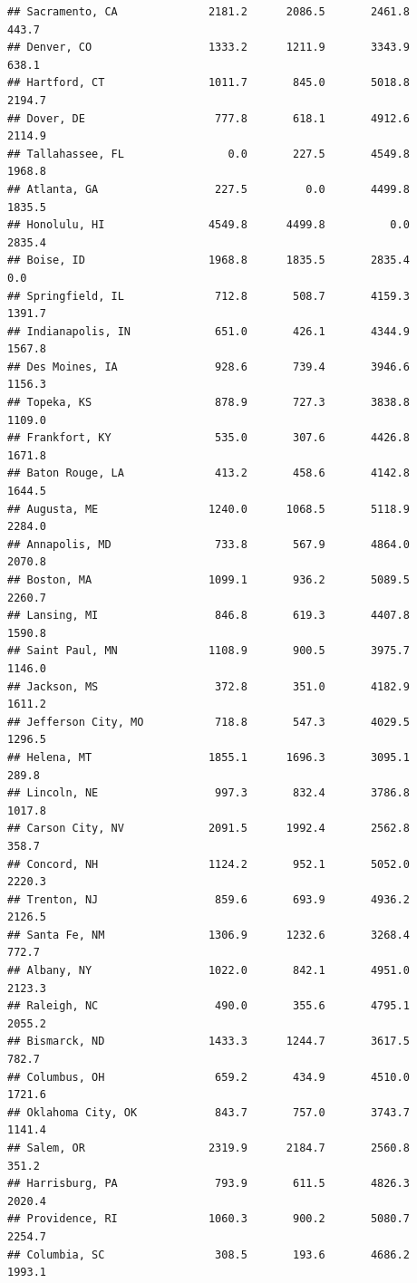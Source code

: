 \documentclass[
]{article}
\begin{document}
\begin{verbatim}
## Sacramento, CA              2181.2      2086.5       2461.8     443.7
## Denver, CO                  1333.2      1211.9       3343.9     638.1
## Hartford, CT                1011.7       845.0       5018.8    2194.7
## Dover, DE                    777.8       618.1       4912.6    2114.9
## Tallahassee, FL                0.0       227.5       4549.8    1968.8
## Atlanta, GA                  227.5         0.0       4499.8    1835.5
## Honolulu, HI                4549.8      4499.8          0.0    2835.4
## Boise, ID                   1968.8      1835.5       2835.4       0.0
## Springfield, IL              712.8       508.7       4159.3    1391.7
## Indianapolis, IN             651.0       426.1       4344.9    1567.8
## Des Moines, IA               928.6       739.4       3946.6    1156.3
## Topeka, KS                   878.9       727.3       3838.8    1109.0
## Frankfort, KY                535.0       307.6       4426.8    1671.8
## Baton Rouge, LA              413.2       458.6       4142.8    1644.5
## Augusta, ME                 1240.0      1068.5       5118.9    2284.0
## Annapolis, MD                733.8       567.9       4864.0    2070.8
## Boston, MA                  1099.1       936.2       5089.5    2260.7
## Lansing, MI                  846.8       619.3       4407.8    1590.8
## Saint Paul, MN              1108.9       900.5       3975.7    1146.0
## Jackson, MS                  372.8       351.0       4182.9    1611.2
## Jefferson City, MO           718.8       547.3       4029.5    1296.5
## Helena, MT                  1855.1      1696.3       3095.1     289.8
## Lincoln, NE                  997.3       832.4       3786.8    1017.8
## Carson City, NV             2091.5      1992.4       2562.8     358.7
## Concord, NH                 1124.2       952.1       5052.0    2220.3
## Trenton, NJ                  859.6       693.9       4936.2    2126.5
## Santa Fe, NM                1306.9      1232.6       3268.4     772.7
## Albany, NY                  1022.0       842.1       4951.0    2123.3
## Raleigh, NC                  490.0       355.6       4795.1    2055.2
## Bismarck, ND                1433.3      1244.7       3617.5     782.7
## Columbus, OH                 659.2       434.9       4510.0    1721.6
## Oklahoma City, OK            843.7       757.0       3743.7    1141.4
## Salem, OR                   2319.9      2184.7       2560.8     351.2
## Harrisburg, PA               793.9       611.5       4826.3    2020.4
## Providence, RI              1060.3       900.2       5080.7    2254.7
## Columbia, SC                 308.5       193.6       4686.2    1993.1

\end{verbatim}
\end{document}
